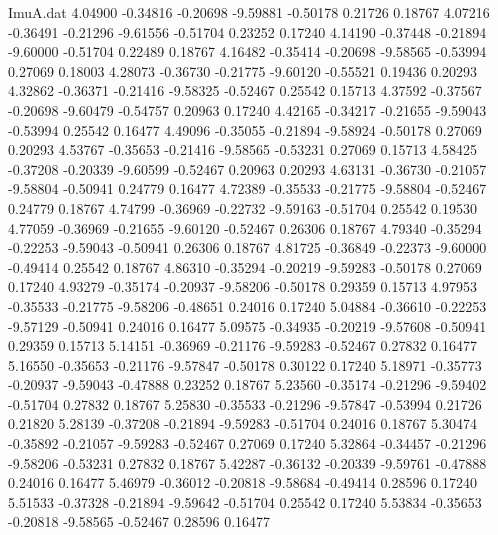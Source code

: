\begin{filecontents}{ImuA.dat}
   4.04900   -0.34816   -0.20698   -9.59881   -0.50178    0.21726    0.18767
   4.07216   -0.36491   -0.21296   -9.61556   -0.51704    0.23252    0.17240
   4.14190   -0.37448   -0.21894   -9.60000   -0.51704    0.22489    0.18767
   4.16482   -0.35414   -0.20698   -9.58565   -0.53994    0.27069    0.18003
   4.28073   -0.36730   -0.21775   -9.60120   -0.55521    0.19436    0.20293
   4.32862   -0.36371   -0.21416   -9.58325   -0.52467    0.25542    0.15713
   4.37592   -0.37567   -0.20698   -9.60479   -0.54757    0.20963    0.17240
   4.42165   -0.34217   -0.21655   -9.59043   -0.53994    0.25542    0.16477
   4.49096   -0.35055   -0.21894   -9.58924   -0.50178    0.27069    0.20293
   4.53767   -0.35653   -0.21416   -9.58565   -0.53231    0.27069    0.15713
   4.58425   -0.37208   -0.20339   -9.60599   -0.52467    0.20963    0.20293
   4.63131   -0.36730   -0.21057   -9.58804   -0.50941    0.24779    0.16477
   4.72389   -0.35533   -0.21775   -9.58804   -0.52467    0.24779    0.18767
   4.74799   -0.36969   -0.22732   -9.59163   -0.51704    0.25542    0.19530
   4.77059   -0.36969   -0.21655   -9.60120   -0.52467    0.26306    0.18767
   4.79340   -0.35294   -0.22253   -9.59043   -0.50941    0.26306    0.18767
   4.81725   -0.36849   -0.22373   -9.60000   -0.49414    0.25542    0.18767
   4.86310   -0.35294   -0.20219   -9.59283   -0.50178    0.27069    0.17240
   4.93279   -0.35174   -0.20937   -9.58206   -0.50178    0.29359    0.15713
   4.97953   -0.35533   -0.21775   -9.58206   -0.48651    0.24016    0.17240
   5.04884   -0.36610   -0.22253   -9.57129   -0.50941    0.24016    0.16477
   5.09575   -0.34935   -0.20219   -9.57608   -0.50941    0.29359    0.15713
   5.14151   -0.36969   -0.21176   -9.59283   -0.52467    0.27832    0.16477
   5.16550   -0.35653   -0.21176   -9.57847   -0.50178    0.30122    0.17240
   5.18971   -0.35773   -0.20937   -9.59043   -0.47888    0.23252    0.18767
   5.23560   -0.35174   -0.21296   -9.59402   -0.51704    0.27832    0.18767
   5.25830   -0.35533   -0.21296   -9.57847   -0.53994    0.21726    0.21820
   5.28139   -0.37208   -0.21894   -9.59283   -0.51704    0.24016    0.18767
   5.30474   -0.35892   -0.21057   -9.59283   -0.52467    0.27069    0.17240
   5.32864   -0.34457   -0.21296   -9.58206   -0.53231    0.27832    0.18767
   5.42287   -0.36132   -0.20339   -9.59761   -0.47888    0.24016    0.16477
   5.46979   -0.36012   -0.20818   -9.58684   -0.49414    0.28596    0.17240
   5.51533   -0.37328   -0.21894   -9.59642   -0.51704    0.25542    0.17240
   5.53834   -0.35653   -0.20818   -9.58565   -0.52467    0.28596    0.16477

\end{filecontents}
